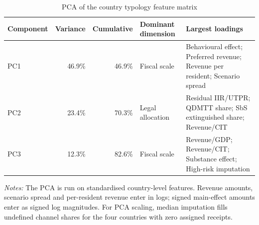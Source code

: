 \begin{table}[H]
\centering
\footnotesize
\setlength{\tabcolsep}{3pt}
\caption[PCA of the country typology feature matrix]{PCA of the country typology feature matrix}
\label{tab:country_typology_pca}
\begin{tabular}{@{}lrrL{3.0cm}L{6.0cm}@{}}
\toprule
Component & Variance & Cumulative & Dominant dimension & Largest loadings \\
\midrule
PC1 & 46.9\% & 46.9\% & Fiscal scale & Behavioural effect; Preferred revenue; Revenue per resident; Scenario spread \\
PC2 & 23.4\% & 70.3\% & Legal allocation & Residual IIR/UTPR; QDMTT share; SbS extinguished share; Revenue/CIT \\
PC3 & 12.3\% & 82.6\% & Fiscal scale & Revenue/GDP; Revenue/CIT; Substance effect; High-risk imputation \\
\bottomrule
\end{tabular}

\vspace{0.35em}
\noindent\begin{minipage}{\textwidth}
\footnotesize\raggedright\textit{Notes:} The PCA is run on standardised country-level features. Revenue amounts, scenario spread and per-resident revenue enter in logs; signed main-effect amounts enter as signed log magnitudes. For PCA scaling, median imputation fills undefined channel shares for the four countries with zero assigned receipts.
\end{minipage}
\end{table}
